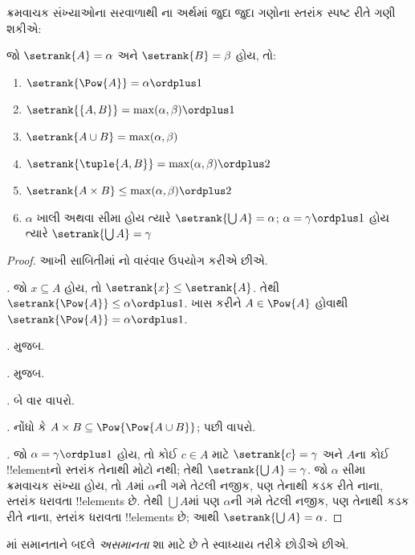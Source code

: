\documentclass[../../../include/open-logic-section]{subfiles}
\begin{document}

ક્રમવાચક સંખ્યાઓના સરવાળાથી
ના અર્થમાં જુદા જુદા
ગણોના સ્તરાંક સ્પષ્ટ રીતે ગણી શકીએ:

\begin{lem}
જો $\setrank{A} = \alpha$ અને $\setrank{B} = \beta$ હોય, તો:
\begin{enumerate}
	\item{} $\setrank{\Pow{A}} = \alpha\ordplus 1$
	\item{} $\setrank{\{A, B\}} = \max(\alpha,
	\beta) \ordplus 1$
	\item{} $\setrank{A \cup B} = \max(\alpha,
	\beta)$
	\item{} $\setrank{\tuple{A,B}} = \max(\alpha,
	\beta) \ordplus  2$
	\item{} $\setrank{A \times B} \leq \max(\alpha,
	\beta) \ordplus  2$
	\item{} $\alpha$ ખાલી અથવા સીમા
	હોય ત્યારે $\setrank{\bigcup A} = \alpha$;
	$\alpha = \gamma\ordplus 1$ હોય ત્યારે
	$\setrank{\bigcup A} = \gamma$
\end{enumerate}
\end{lem}

\begin{proof}
આખી સાબિતીમાં નો
વારંવાર ઉપયોગ કરીએ છીએ.

\emph{.} જો $x \subseteq A$ હોય, તો
$\setrank{x} \leq
\setrank{A}$. તેથી $\setrank{\Pow{A}} \leq \alpha \ordplus  1$.
ખાસ કરીને $A
\in \Pow{A}$ હોવાથી $\setrank{\Pow{A}} = \alpha \ordplus  1$.

\emph{.}  મુજબ.

\emph{.}  મુજબ.

\emph{.}  બે વાર વાપરો.

\emph{.} નોંધો કે
$A \times B \subseteq
\Pow{\Pow{A \cup B}}$; પછી  વાપરો.

\emph{.} જો $\alpha = \gamma\ordplus 1$
હોય, તો કોઈ $c \in A$ માટે $\setrank{c} = \gamma$
અને $A$ના કોઈ !!{element}નો સ્તરાંક તેનાથી મોટો નથી;
તેથી $\setrank{\bigcup A} = \gamma$. જો $\alpha$
સીમા ક્રમવાચક સંખ્યા હોય, તો $A$માં $\alpha$ની
ગમે તેટલી નજીક, પણ તેનાથી કડક રીતે નાના, સ્તરાંક
ધરાવતા !!{element}s છે. તેથી $\bigcup A$માં પણ
$\alpha$ની ગમે તેટલી નજીક, પણ તેનાથી કડક રીતે
નાના, સ્તરાંક ધરાવતા !!{element}s છે; આથી
$\setrank{\bigcup A} = \alpha$.
\end{proof}
\noindent
{}માં સમાનતાને બદલે \emph{અસમાનતા}
શા માટે છે તે સ્વાધ્યાય તરીકે છોડીએ છીએ.
\end{document}
